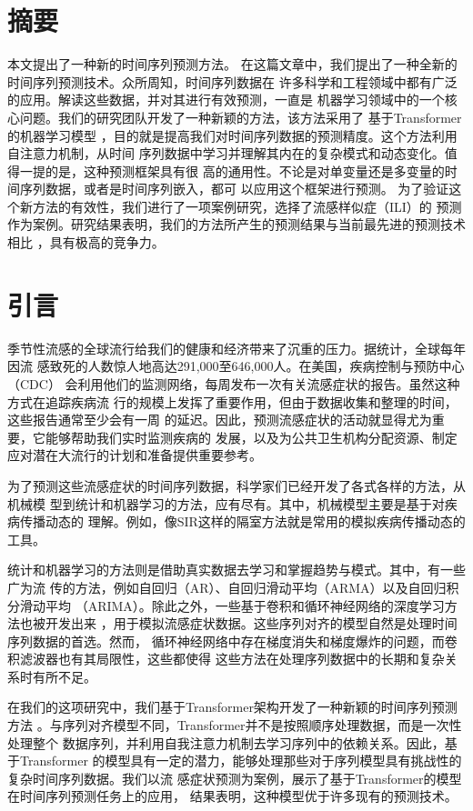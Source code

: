 \section{摘要}
本文提出了一种新的时间序列预测方法。
在这篇文章中，我们提出了一种全新的时间序列预测技术。众所周知，时间序列数据在
许多科学和工程领域中都有广泛的应用。解读这些数据，并对其进行有效预测，一直是
机器学习领域中的一个核心问题。我们的研究团队开发了一种新颖的方法，该方法采用了
基于Transformer的机器学习模型
，目的就是提高我们对时间序列数据的预测精度。这个方法利用自注意力机制，从时间
序列数据中学习并理解其内在的复杂模式和动态变化。值得一提的是，这种预测框架具有很
高的通用性。不论是对单变量还是多变量的时间序列数据，或者是时间序列嵌入，都可
以应用这个框架进行预测。
为了验证这个新方法的有效性，我们进行了一项案例研究，选择了流感样似症（ILI）的
预测作为案例。研究结果表明，我们的方法所产生的预测结果与当前最先进的预测技术相比
，具有极高的竞争力。
\section{引言}
季节性流感的全球流行给我们的健康和经济带来了沉重的压力。据统计，全球每年因流
感致死的人数惊人地高达291,000至646,000人。在美国，疾病控制与预防中心（CDC）
会利用他们的监测网络，每周发布一次有关流感症状的报告。虽然这种方式在追踪疾病流
行的规模上发挥了重要作用，但由于数据收集和整理的时间，这些报告通常至少会有一周
的延迟。因此，预测流感症状的活动就显得尤为重要，它能够帮助我们实时监测疾病的
发展，以及为公共卫生机构分配资源、制定应对潜在大流行的计划和准备提供重要参考。

为了预测这些流感症状的时间序列数据，科学家们已经开发了各式各样的方法，从机械模
型到统计和机器学习的方法，应有尽有。其中，机械模型主要是基于对疾病传播动态的
理解。例如，像SIR这样的隔室方法就是常用的模拟疾病传播动态的工具。

统计和机器学习的方法则是借助真实数据去学习和掌握趋势与模式。其中，有一些广为流
传的方法，例如自回归（AR）、自回归滑动平均（ARMA）以及自回归积分滑动平均
（ARIMA）。除此之外，一些基于卷积和循环神经网络的深度学习方法也被开发出来
，用于模拟流感症状数据。这些序列对齐的模型自然是处理时间序列数据的首选。然而，
循环神经网络中存在梯度消失和梯度爆炸的问题，而卷积滤波器也有其局限性，这些都使得
这些方法在处理序列数据中的长期和复杂关系时有所不足。

在我们的这项研究中，我们基于Transformer架构开发了一种新颖的时间序列预测方法
。与序列对齐模型不同，Transformer并不是按照顺序处理数据，而是一次性处理整个
数据序列，并利用自我注意力机制去学习序列中的依赖关系。因此，基于Transformer
的模型具有一定的潜力，能够处理那些对于序列模型具有挑战性的复杂时间序列数据。我们以流
感症状预测为案例，展示了基于Transformer的模型在时间序列预测任务上的应用，
结果表明，这种模型优于许多现有的预测技术。

